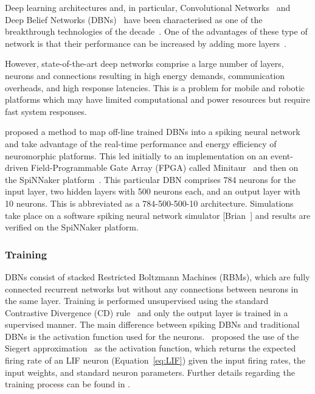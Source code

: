 \documentclass{frontiersENG} %
\begin{document}
Deep learning architectures and, in particular, Convolutional Networks~\citep{lecun1998gradient} and Deep Belief Networks (DBNs)~\citep{hinton2006fast} have been characterised as one of the breakthrough technologies of the decade~\citep{MIT_TechReview}. One of the advantages of these type of network is that their performance can be increased by adding more layers~\citep{hinton2006fast}.

However, state-of-the-art deep networks comprise a large number of layers, neurons and connections resulting in high energy demands, communication overheads, and high response latencies. This is a problem for mobile and robotic platforms which may have limited computational and power resources but require fast system responses. 


\citet{o2013real} proposed a method to map off-line trained DBNs into a spiking neural network and take advantage of the real-time performance and energy efficiency of neuromorphic platforms. This led initially to an implementation on an event-driven Field-Programmable Gate Array (FPGA) called Minitaur~\citep{neil2014minitaur} and then on the SpiNNaker platform~\citep{Stromatias2015scalable}.
This particular DBN comprises 784 neurons for the input layer, two hidden layers with 500 neurons each, and an output layer with 10 neurons. This is abbreviated as a 784-500-500-10 architecture.
Simulations take place on a software spiking neural network simulator [Brian~\citep{goodman2008brian}] and results are verified on the SpiNNaker platform.

\subsubsection{Training}

DBNs consist of stacked Restricted Boltzmann Machines (RBMs), which are fully connected recurrent networks but without any connections between neurons in the same layer. Training is performed unsupervised using the standard Contrastive Divergence (CD) rule~\citep{hinton2006fast} and only the output layer is trained in a supervised manner. The main difference between spiking DBNs and traditional DBNs is the activation function used for the neurons.~\cite{o2013real} proposed the use of the Siegert approximation~\citep{Jug_etal_2012} as the activation function, which returns the expected firing rate of an LIF neuron (Equation~\ref{eq:LIF}) given the input firing rates, the input weights, and standard neuron parameters. Further details regarding the training process can be found in \citet{o2013real}.
\end{document}
